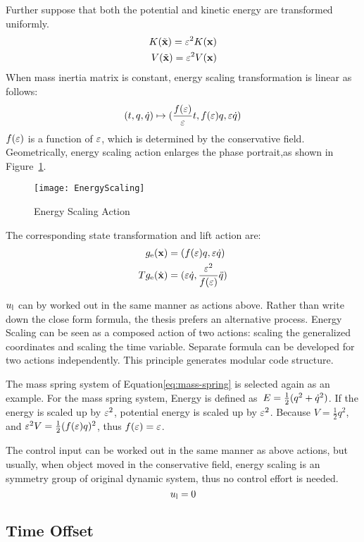 Further suppose that both the potential and kinetic energy are transformed uniformly.
\begin{align}
K(\tilde{\mathbf{x}})=\varepsilon^2 K(\mathbf{x}) \nonumber\\
V(\tilde{\mathbf{x}})=\varepsilon^2 V(\mathbf{x}) \nonumber
\end{align}
When mass inertia matrix is constant, energy scaling transformation is linear as follows:
\[
(t,q,\dot{q} ) \mapsto ( \frac{f(\varepsilon)}{\varepsilon}t ,f(\varepsilon)q,\varepsilon\dot{q})
\]
$f(\varepsilon)$ is a function of $\varepsilon$, which is determined by the conservative field.
Geometrically, energy scaling action enlarges the phase portrait,as shown in Figure~\ref{fig:gen}.
\begin{figure}[!htbp]
  \begin{center}
      \texttt{[image: EnergyScaling]}
    \caption{Energy Scaling Action}
    \label{fig:gen}
\end{center}
\end{figure}

The corresponding  state transformation and lift action are:
\begin{align}
g_{\mathrm{e}}(\mathbf{x})&=(f(\varepsilon) q,\varepsilon \dot{q}) \nonumber\\
Tg_{\mathrm{e}}(\dot{\mathbf{x}})&=(\varepsilon \dot{q},\frac{\varepsilon^2}{f(\varepsilon)}\ddot{q})
\end{align}

$u_{\mathrm{l}}$ can by worked out in the same manner as actions above.
Rather than write down the close form formula, the thesis prefers an alternative process.
Energy Scaling can be seen as a composed action of two actions: scaling the generalized coordinates and scaling the time variable.
Separate formula can be developed for two actions independently.
This principle generates modular code structure.




The mass spring system of Equation\ref{eq:mass-spring} is selected again as an example.
 For the mass spring system, Energy is defined as~$E=\frac{1}{2}(q^2+\dot{q}^2)$.
 If the energy is scaled up by $\varepsilon^2$,  potential energy is scaled up by $\varepsilon^2$.
 Because $V= \frac{1}{2}q^2$, and $\varepsilon^2 V=\frac{1}{2}(f(\varepsilon)q)^2$, thus $f(\varepsilon)=\varepsilon$.
 
 
The control input can be worked out in the same manner as above actions, but usually, when object moved in the conservative field, energy scaling is an symmetry group of original dynamic system, thus no control effort is needed.
\[
u_{\mathrm{l}}=0
\]



\subsection*{Time Offset}

